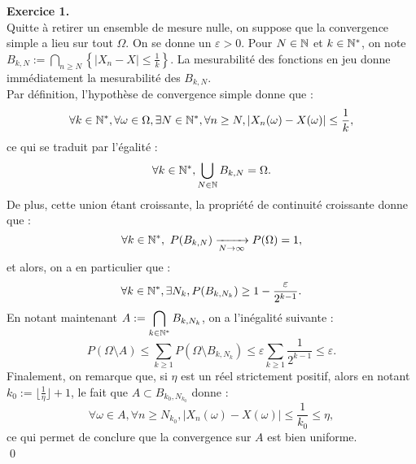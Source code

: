\documentclass[12pt,a4paper]{article}
\begin{document}
\textbf{Exercice 1.}\\

Quitte à retirer un ensemble de mesure nulle, on suppose que la convergence simple a lieu sur tout $\Omega$. On se donne un $\varepsilon > 0$. Pour $N\in \mathbb N$ et $k \in \mathbb N^* $, on note $\displaystyle B_{k,N} := \bigcap_{n\geq N} \left\{|X_n-X | \leq \frac{1}{k} \right \}$. La mesurabilité des fonctions en jeu donne immédiatement la mesurabilité des $B_{k,N}$. \\ 

\noindent Par définition, l'hypothèse de convergence simple donne que : \[ \forall k \in \mathbb N^*, \forall \omega \in \Omega, \exists N \in \mathbb N^*, \forall n\geq N, |X_n(\omega)-X(\omega) | \leq \frac{1}{k},   \] ce qui se traduit par l'égalité :
\[\forall k \in \mathbb N^*, \bigcup_{N\in \mathbb N}B_{k,N} = \Omega.\]
De plus, cette union étant croissante, la propriété de continuité croissante donne que : \[\forall k \in \mathbb N^*, \  P(B_{k,N}) \xrightarrow[N \to \infty]{} P(\Omega)=1, \]
et alors, on a en particulier que : \[\forall k \in \mathbb N^*, \exists N_k, P(B_{k,N_k}) \geq 1-\frac{\varepsilon}{2^{k-1}}.\]
En notant maintenant $\displaystyle A:=\bigcap_{k\in\mathbb N^*}B_{k,N_k}$, on a l'inégalité suivante :
\[P(\Omega\setminus A) \leq \sum_{k\geq 1} P(\Omega\setminus B_{k,N_k}) \leq \varepsilon\sum_{k\geq 1} \frac{1}{2^{k-1}} \leq \varepsilon. \]
Finalement, on remarque que, si $\eta$ est un réel strictement positif, alors en notant $k_0 := \lfloor \frac{1}{\eta}\rfloor +1$, le fait que $A \subset B_{k_0,N_{k_0}}$ donne :
\[\forall \omega \in A, \forall n \geq N_{k_0}, |X_n(\omega)-X(\omega) | \leq \frac{1}{k_0} \leq \eta, \]
ce qui permet de conclure que la convergence sur $A$ est bien uniforme.  \\ \qed
\end{document}
